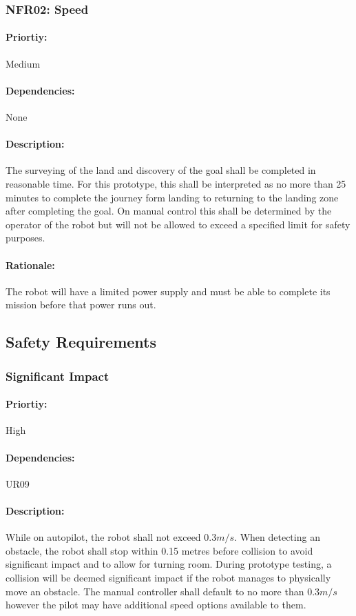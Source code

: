 \documentclass[10pt,a4paper,titlepage]{article}
\begin{document}
	\subsubsection*{NFR02: Speed}
	\paragraph{Priortiy:} Medium
	\paragraph{Dependencies:} None
	\paragraph {Description:} The surveying of the land and discovery of the goal shall be completed in reasonable time. For this prototype, this shall be interpreted as no more than 25 minutes to complete the journey form landing to returning to the landing zone after completing the goal. On manual control this shall be determined by the operator of the robot but will not be allowed to exceed a specified limit for safety purposes.
	\paragraph {Rationale:} The robot will have a limited power supply and must be able to complete its mission before that power runs out. 
	
	\subsection{Safety Requirements}
	\subsubsection*{Significant Impact}
	\paragraph{Priortiy:} High
	\paragraph{Dependencies:} UR09
	\paragraph {Description:} While on autopilot, the robot shall not exceed \begin{math}0.3 m/s\end{math}. When detecting an obstacle, the robot shall stop within 0.15 metres before collision to avoid significant impact and to allow for turning room. During prototype testing, a collision will be deemed significant impact if the robot manages to physically move an obstacle. The manual controller shall default to no more than \begin{math}0.3 m/s\end{math} however the pilot may have additional speed options available to them.
\end{document}
